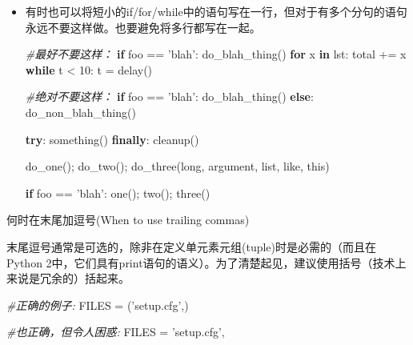 \documentclass[ignorenonframetext,9pt]{beamer}
\newenvironment{Shaded}{}{}
\newcommand{\BuiltInTok}[1]{#1}
\newcommand{\CommentTok}[1]{\textcolor[rgb]{0.38,0.63,0.69}{\textit{#1}}}
\newcommand{\ControlFlowTok}[1]{\textcolor[rgb]{0.00,0.44,0.13}{\textbf{#1}}}
\newcommand{\DecValTok}[1]{\textcolor[rgb]{0.25,0.63,0.44}{#1}}
\newcommand{\KeywordTok}[1]{\textcolor[rgb]{0.00,0.44,0.13}{\textbf{#1}}}
\newcommand{\NormalTok}[1]{#1}
\newcommand{\OperatorTok}[1]{\textcolor[rgb]{0.40,0.40,0.40}{#1}}
\newcommand{\StringTok}[1]{\textcolor[rgb]{0.25,0.44,0.63}{#1}}
\begin{document}
\begin{frame}[fragile]

\begin{itemize}
\item
  有时也可以将短小的if/for/while中的语句写在一行，但对于有多个分句的语句永远不要这样做。也要避免将多行都写在一起。

\begin{Shaded}
\begin{Highlighting}[]
\CommentTok{#最好不要这样：}
\ControlFlowTok{if}\NormalTok{ foo }\OperatorTok{==} \StringTok{'blah'}\NormalTok{: do_blah_thing()}
\ControlFlowTok{for}\NormalTok{ x }\KeywordTok{in}\NormalTok{ lst: total }\OperatorTok{+=}\NormalTok{ x}
\ControlFlowTok{while}\NormalTok{ t }\OperatorTok{<} \DecValTok{10}\NormalTok{: t }\OperatorTok{=}\NormalTok{ delay()}

\CommentTok{#绝对不要这样：}
\ControlFlowTok{if}\NormalTok{ foo }\OperatorTok{==} \StringTok{'blah'}\NormalTok{: do_blah_thing()}
\ControlFlowTok{else}\NormalTok{: do_non_blah_thing()}

\ControlFlowTok{try}\NormalTok{: something()}
\ControlFlowTok{finally}\NormalTok{: cleanup()}

\NormalTok{do_one()}\OperatorTok{;}\NormalTok{ do_two()}\OperatorTok{;}\NormalTok{ do_three(}\BuiltInTok{long}\NormalTok{, argument,}
\BuiltInTok{list}\NormalTok{, like, this)}

\ControlFlowTok{if}\NormalTok{ foo }\OperatorTok{==} \StringTok{'blah'}\NormalTok{: one()}\OperatorTok{;}\NormalTok{ two()}\OperatorTok{;}\NormalTok{ three()}
\end{Highlighting}
\end{Shaded}
\end{itemize}

\end{frame}

\begin{frame}[fragile]{何时在末尾加逗号(When to use trailing commas)}
\protect\hypertarget{ux4f55ux65f6ux5728ux672bux5c3eux52a0ux9017ux53f7when-to-use-trailing-commas}{}

末尾逗号通常是可选的，除非在定义单元素元组(tuple)时是必需的（而且在Python
2中，它们具有print语句的语义）。为了清楚起见，建议使用括号（技术上来说是冗余的）括起来。

\begin{Shaded}
\begin{Highlighting}[]
\CommentTok{#正确的例子:}
\NormalTok{FILES }\OperatorTok{=}\NormalTok{ (}\StringTok{'setup.cfg'}\NormalTok{,)}

\CommentTok{#也正确，但令人困惑:}
\NormalTok{FILES }\OperatorTok{=} \StringTok{'setup.cfg'}\NormalTok{,}
\end{Highlighting}
\end{Shaded}

\end{frame}
\end{document}

